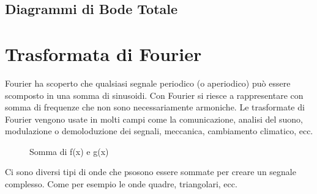 \documentclass[a4paper]{article}
\begin{document}
\subsection{Diagrammi di Bode Totale}

\pagebreak

\section{Trasformata di Fourier}

Fourier ha scoperto che qualsiasi segnale periodico (o aperiodico) può essere scomposto in una somma di sinusoidi.
Con Fourier si riesce a rappresentare con somma di frequenze che non sono necessariamente armoniche.
Le trasformate di Fourier vengono usate in molti campi come la comunicazione, analisi del suono, modulazione o demoloduzione dei segnali, meccanica, cambiamento climatico, ecc.


\begin{figure}[H]
    \centering
\end{figure}

\begin{figure}[H]
    \centering
\end{figure}

\begin{figure}[H]
    \centering
        \caption{Somma di f(x) e g(x)}
\end{figure}
Ci sono diversi tipi di onde che psosono essere sommate per creare un segnale complesso.
Come per esempio le onde quadre, triangolari, ecc. 
\end{document}
